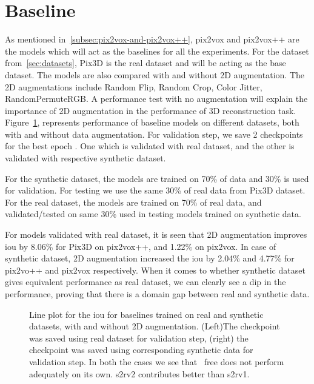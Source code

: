 \section{Baseline}\label{sec:baseline}

As mentioned in~\ref{subsec:pix2vox-and-pix2vox++}, pix2vox and pix2vox++ are the models which will act as the baselines for all the experiments.
For the dataset from~\ref{sec:datasets}, Pix3D is the real dataset and will be acting as the base dataset.
The models are also compared with and without 2D augmentation.
The 2D augmentations include Random Flip, Random Crop, Color Jitter, RandomPermuteRGB.
A performance test with no augmentation will explain the importance of 2D augmentation in the performance of 3D reconstruction task.
Figure~\ref{fig:baseline1}, represents performance of baseline models on different datasets, both with and without data augmentation.
For validation step, we save 2 checkpoints for the best epoch .
One which is validated with real dataset, and the other is validated with respective synthetic dataset.

For the synthetic dataset, the models are trained on 70\% of data and 30\% is used for validation.
For testing we use the same 30\% of real data from Pix3D dataset.
For the real dataset, the models are trained on 70\% of real data, and validated/tested on same 30\% used in testing models trained on synthetic data.

For models validated with real dataset, it is seen that 2D augmentation improves \gls{iou}  by 8.06\% for Pix3D on pix2vox++, and 1.22\% on pix2vox.
In case of synthetic dataset, 2D augmentation increased the \gls{iou}  by 2.04\% and 4.77\%  for pix2vo++ and pix2vox respectively.
When it comes to whether synthetic dataset gives equivalent performance as real dataset, we can clearly see a dip in the performance,
proving that there is a domain gap between real and synthetic data.

\begin{figure}
    \centering
    \resizebox{0.49\linewidth}{!}{}
    \resizebox{0.49\linewidth}{!}{}
    \caption{Line plot for the \gls{iou}  for baselines trained on real and synthetic datasets, with and without 2D augmentation.
        (Left)The checkpoint was saved using real dataset for validation step, (right) the checkpoint was saved using corresponding synthetic data for validation step.
        In both the cases we see that ~\gls{free} does not perform adequately on its own. \gls{s2rv2} contributes better than \gls{s2rv1}.}
    \label{fig:baseline1}
\end{figure}

